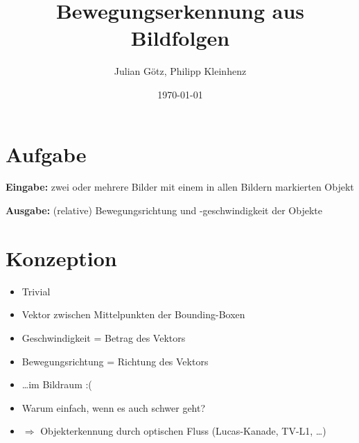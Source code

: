 \documentclass[10pt]{beamer}
\title{Bewegungserkennung aus Bildfolgen}
\subtitle{}
\date{\myformat\today}
\author{Julian G{\"o}tz, Philipp Kleinhenz}
\institute{Hochschule f{\"u}r Technik, Wirtschaft und Kultur Leipzig}
\begin{document}
\maketitle
{}
\def\code#1{\texttt{#1}}


\section{Aufgabe}
\begin{frame}{\secname}

\textbf{Eingabe: }zwei oder mehrere Bilder mit einem in allen Bildern markierten Objekt

\textbf{Ausgabe: }(relative) Bewegungsrichtung und -geschwindigkeit der Objekte

\end{frame}

\section{Konzeption}
\begin{frame}{\secname}

\begin{itemize}
	\item Trivial
	\item Vektor zwischen Mittelpunkten der Bounding-Boxen
	\item Geschwindigkeit = Betrag des Vektors
	\item Bewegungsrichtung = Richtung des Vektors
	\item \dots im Bildraum :(
\end{itemize}

\begin{itemize} 
	\item Warum einfach, wenn es auch schwer geht?
	\item $\Rightarrow$ Objekterkennung durch optischen Fluss (Lucas-Kanade, TV-L1, \dots)
\end{itemize}

\end{frame}
\end{document}
